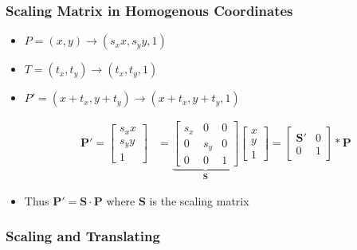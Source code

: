 \documentclass[letterpaper,12pt]{article}
\newcommand{\vect}[1]{\mathbf{#1}}
\newcommand{\matr}[1]{\mathbf{#1}}
\begin{document}
\subsubsection{Scaling Matrix in Homogenous Coordinates}
\begin{itemize}
 \item $P = (x,y) \to (s_x x, s_yy,1)$
 \item $T = (t_x, t_y) \to (t_x, t_y, 1)$
 \item $P' = (x + t_x, y + t_y) \to (x + t_x, y + t_y, 1)$

       \begin{align}
        \vect{P}' = \begin{bmatrix}
         s_x x \\
         s_y y \\
         1
        \end{bmatrix}
         & = \underbrace{\begin{bmatrix}
          s_x & 0   & 0 \\
          0   & s_y & 0 \\
          0   & 0   & 1
         \end{bmatrix}}_\matr{S}
        \begin{bmatrix}
         x \\
         y \\
         1
        \end{bmatrix}
        = \begin{bmatrix}
         \matr{S}' & 0 \\
         0         & 1
        \end{bmatrix}
        * \vect{P}
       \end{align}
 \item Thus $\vect{P}' = \matr{S} \cdot \vect{P}$ where $\matr{S}$ is the scaling matrix
\end{itemize}

\subsubsection{Scaling and Translating}
\end{document}
